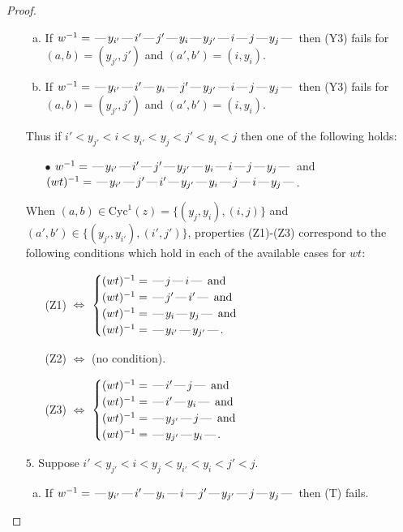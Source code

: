\documentclass[10pt]{article}
\theoremstyle{definition}
\theoremstyle{definition}
\def\dash{\text{\hspace{0.5mm}---\hspace{0.5mm}}}
\def\Cyc{\mathrm{Cyc}}
\begin{document}
\begin{proof}
\begin{enumerate}
\begin{enumerate}[(a)]
\item If $w^{-1} = \dash y_{i'}\dash i'\dash j'\dash y_i\dash y_{j'}\dash i\dash j\dash y_j\dash $ then (Y3) fails for $(a,b)=(y_{j'},j')$ and $(a',b')=(i,y_i)$.
\item If $w^{-1} = \dash y_{i'}\dash i'\dash y_i\dash j'\dash y_{j'}\dash i\dash j\dash y_j\dash $ then (Y3) fails for $(a,b)=(y_{j'},j')$ and $(a',b')=(i,y_i)$.
\end{enumerate}
Thus if $i' < y_{j'} < i < y_{i'} < y_j < j' < y_i < j$ then one of the following holds:
\begin{enumerate}
\item[$\bullet$] $w^{-1} = \dash y_{i'}\dash i'\dash j'\dash y_{j'}\dash y_i\dash i\dash j\dash y_j\dash $ and $(wt)^{-1} = \dash y_{i'}\dash j'\dash i'\dash y_{j'}\dash y_i\dash j\dash i\dash y_j\dash $.
\end{enumerate}
When $(a,b)\in\Cyc^1(z)=\{(y_j,y_i),(i,j)\}$ and $(a',b')\in\{(y_{j'},y_{i'}),(i',j')\}$,
properties (Z1)-(Z3) correspond to the following conditions which
hold in each of the available cases for $wt$:
\begin{enumerate}
\item[](Z1) $\Leftrightarrow$ $\begin{cases}\text{$(wt)^{-1} = \dash j \dash i \dash$}\text{ and }\\
\text{$(wt)^{-1} = \dash j' \dash i' \dash$}\text{ and }\\
\text{$(wt)^{-1} = \dash y_i \dash y_j \dash$}\text{ and }\\
\text{$(wt)^{-1} = \dash y_{i'} \dash y_{j'} \dash$}.\end{cases}$
\item[](Z2) $\Leftrightarrow$ (no condition).
\item[](Z3) $\Leftrightarrow$ $\begin{cases}\text{$(wt)^{-1} = \dash i' \dash j \dash$}\text{ and }\\
\text{$(wt)^{-1} = \dash i' \dash y_i \dash$}\text{ and }\\
\text{$(wt)^{-1} = \dash y_{j'} \dash j \dash$}\text{ and }\\
\text{$(wt)^{-1} = \dash y_{j'} \dash y_i \dash$}.\end{cases}$
\end{enumerate}
\item[$5$.] Suppose $i' < y_{j'} < i < y_j < y_{i'} < y_i < j' < j$.
\begin{enumerate}[(a)]
\item If $w^{-1} = \dash y_{i'}\dash i'\dash y_i\dash i\dash j'\dash y_{j'}\dash j\dash y_j\dash $ then (T) fails.

\end{enumerate}
\end{enumerate}
\end{proof}
\end{document}
